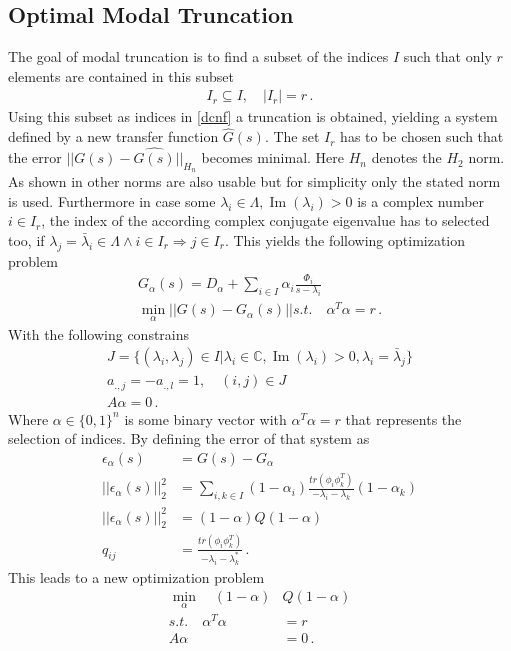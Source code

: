 \subsection{Optimal Modal Truncation}
The goal of modal truncation is to find a subset of the indices \(I\)  such that only \(r\) elements are contained in this subset
\begin{gather}
I_r \subseteq I, \quad |I_r| = r \,.
\end{gather}
Using this subset as indices in \ref{dcnf} a truncation is obtained, yielding a system defined by a new transfer function \(\hat{G}(s)\).
The set \(I_r\) has to be chosen such that the error \(||G(s) - \hat{G(s)}||_{H_n}\) becomes minimal.
Here  \(H_n\) denotes the \(H_2\)  norm.
As shown in \cite{vuillemin2020optimal} other norms are also usable but for simplicity only the stated norm is used.
Furthermore in case some \(\lambda_i \in \Lambda, \operatorname{Im}(\lambda_i) > 0\) is a complex number  \(i \in I_r\), the index of the according complex conjugate eigenvalue has to selected too, if \(\lambda_j = \bar{\lambda}_i \in \Lambda \wedge i \in I_r \Rightarrow j \in I_r\). 
This yields the following optimization problem
\begin{gather}
G_{\alpha}(s) = D_{\alpha} + \sum_{i \in I} \alpha_i \frac{\Phi_i}{s - \lambda_i} \\ 
\min_{\alpha} ||G(s) - G_{\alpha}(s)|| s.t. \quad
\alpha^{T}\alpha = r \,.
\end{gather}
With the following constrains
\begin{gather}
J = \{(\lambda_i, \lambda_j) \in I | \lambda_i \in \mathbb{C}, \operatorname{Im}(\lambda_i) > 0, \lambda_i = \bar{\lambda}_j\} \\
a_{.,j} = -a_{.,l} = 1, \quad	(i, j) \in J \\
A\alpha = 0 \,.
\end{gather}
Where \(\alpha \in \{0, 1\}^{n}\) is some binary vector with \(\alpha^{T} \alpha = r\) that represents the selection of indices.
By defining the error of that system as
\begin{align}
\epsilon_{\alpha}(s) &= G(s) - G_{\alpha} \\
||\epsilon_{\alpha}(s)||_2^2 &= \sum_{i, k \in I} (1-\alpha_i) \frac{tr(\phi_i \phi_k^{T})}{-\lambda_i - \lambda_k}(1-\alpha_k) \\
||\epsilon_{\alpha}(s)||_2^2 &= (1-\alpha)Q(1-\alpha) \\
q_{ij} &= \frac{tr(\phi_i \phi_k^{T})}{-\lambda_i - \lambda_k^*} \,.
\end{align} 
This leads to a new optimization problem \cite{vuillemin2020optimal}
\begin{align}
\min_{\alpha} \quad (1-\alpha)&Q(1-\alpha) \label{opt-h2}\\
s.t. \quad \alpha^T\alpha &= r \\
A\alpha &= 0 \,.
\end{align}

